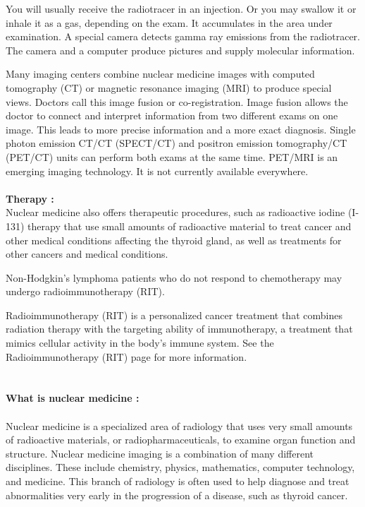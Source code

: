 \documentclass[12pt]{article}
\begin{document}
\noindent You will usually receive the radiotracer in an injection. Or you may swallow it or inhale it as a gas, depending on the exam. It accumulates in the area under examination. A special camera detects gamma ray emissions from the radiotracer. The camera and a computer produce pictures and supply molecular information.

 
\noindent Many imaging centers combine nuclear medicine images with computed tomography (CT) or magnetic resonance imaging (MRI) to produce special views. Doctors call this image fusion or co-registration. Image fusion allows the doctor to connect and interpret information from two different exams on one image. This leads to more precise information and a more exact diagnosis. Single photon emission CT/CT (SPECT/CT) and positron emission tomography/CT (PET/CT) units can perform both exams at the same time. PET/MRI is an emerging imaging technology. It is not currently available everywhere.
\noindent 
\\ \\ \textbf{\large Therapy :}
\\ Nuclear medicine also offers therapeutic procedures, such as radioactive iodine (I-131) therapy that use small amounts of radioactive material to treat cancer and other medical conditions affecting the thyroid gland, as well as treatments for other cancers and medical conditions.

\noindent Non-Hodgkin's lymphoma patients who do not respond to chemotherapy may undergo radioimmunotherapy (RIT).

\noindent Radioimmunotherapy (RIT) is a personalized cancer treatment that combines radiation therapy with the targeting ability of immunotherapy, a treatment that mimics cellular activity in the body's immune system. See the Radioimmunotherapy (RIT) page for more information.\\


\\ \\ \noindent
\textbf{\large What is nuclear medicine :} \\ \\ Nuclear medicine is a specialized area of radiology that uses very small amounts of radioactive materials, or radiopharmaceuticals, to examine organ function and structure. Nuclear medicine imaging is a combination of many different disciplines. These include chemistry, physics, mathematics, computer technology, and medicine. This branch of radiology is often used to help diagnose and treat abnormalities very early in the progression of a disease, such as thyroid cancer.
\end{document}

